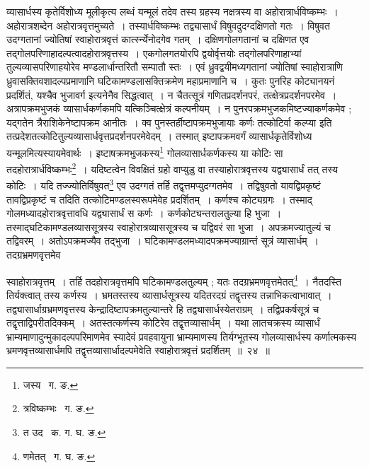 \documentclass[11pt, openany]{book}
\begin{document}
\noindent व्यासार्धस्य कृतेर्विशोध्य मूलीकृत्य लब्धं यन्मूलं तदेव तस्य ग्रहस्य नक्षत्रस्य वा अहोरात्रार्धविष्कम्भः~। अहोरात्रशब्देन
अहोरात्रवृत्तमुच्यते~। तस्यार्धविष्कम्भः तद्व्यासार्धं विषुवदुदग्दक्षिणतो गतः~। विषुवत उदग्गतानां ज्योतिषां स्वाहोरात्रवृत्तं कार्त्स्न्येनोदगेव गतम्~।
दक्षिणगोलगतानां च दक्षिणत एव तद्गोलपरिणाहादल्पत्वादहोरात्रवृत्तस्य~। एकगोलगतयोरपि द्वयोर्वृत्तयोः तद्गोलपरिणाहाभ्यां तुल्यव्यासपरिणाहयोरेव 
मण्डलार्धान्तरितौ सम्पातौ स्तः~। एवं ध्रुवद्वयीमध्यगतानां ज्योतिषां स्वाहोरात्राणि ध्रुवासक्तिवशादल्पप्रमाणानि घटिकामण्डलासक्तिक्रमेण 
महाप्रमाणानि च~। कुतः पुनरिह कोट्यानयनं प्रदर्शितं, {\qt यश्चैव भुजावर्ग} इत्यनेनैव सिद्धत्वात्~। न चैतत्सूत्रं गणितप्रदर्शनपरं,
तत्क्षेत्रप्रदर्शनपरमेव~। अत्रापक्रमभुजकं व्यासार्धकर्णकमपि यत्किञ्चित्क्षेत्रं कल्पनीयम्~। न पुनरपक्रमभुजकमिष्टज्याकर्णकमेव ; यद्गतेन त्रैराशिकेनेष्टापक्रम आनीतः~। क्व पुनस्तर्हीष्टापक्रमभुजायाः कर्णः तत्कोटिर्वा कल्प्या इति तत्प्रदेशतत्कोटितुल्यव्यासार्धवृत्तप्रदर्शनपरमेवेदम्~। तस्मात् इष्टापक्रमवर्गं व्यासार्धकृतेर्विशोध्य यन्मूलमित्यस्यायमेवार्थः~।  इष्टाषक्रमभुजकस्य\renewcommand{\thefootnote}{१}\footnote{जस्य \textendash\ ग. ङ.} गोलव्यासार्धकर्णकस्य या कोटिः सा तदहोरात्रार्धविष्कम्भः\renewcommand{\thefootnote}{२}\footnote{त्रविष्कम्भः \textendash\ ग. ङ.}~। यदिष्टत्वेन विवक्षितं ग्रहो वाप्युडु वा तस्याहोरात्रवृत्तस्य यद्व्यासार्धं तत् तस्य कोटिः~। यदि तज्ज्योतिर्विषुवत\renewcommand{\thefootnote}{३}\footnote{त उद \textendash\ क. ग. घ. ङ.} एव उदग्गतं तर्हि तद्वृत्तमप्युदग्गतमेव~। तद्विषुवतो यावद्विप्रकृष्टं तावद्विप्रकृष्टं च तदिति तत्कोटिमण्डलस्वरूपमेवेह प्रदर्शितम्~। कर्णश्च कोट्यग्रगः~। तस्माद्
गोलमध्यादहोरात्रवृत्तावधि यद्व्यासार्धं स कर्णः~। कर्णकोट्यन्तरालतुल्या हि भुजा~। तस्माद्घटिकामण्डलव्याससूत्रस्य स्वाहोरात्रव्याससूत्रस्य च यद्विवरं सा भुजा~। अपक्रमज्यातुल्यं च तद्विवरम्~। अतोऽपक्रमज्यैव तद्भुजा~। घटिकामण्डलमध्यादपक्रमज्याग्रान्तं सूत्रं व्यासार्धम्~।
तदग्रभ्रमणवृत्तमेव 

\newpage

\noindent स्वाहोरात्रवृत्तम्~। तर्हि तदहोरात्रवृत्तमपि घटिकामण्डलतुल्यम् ; यतः तदग्रभ्रमणवृत्तमेतत्\renewcommand{\thefootnote}{१}\footnote{णमेतत् \textendash\ ग. घ. ङ.}~। नैतदस्ति तिर्यक्त्वात् तस्य कर्णस्य~। भ्रमतस्तस्य व्यासार्धसूत्रस्य यदितरदग्रं तद्वृत्तस्य तन्नाभिकत्वाभावात्~। तद्व्यासार्धाग्रभ्रमणवृत्तस्य केन्द्रादिष्टापक्रमतुल्यान्तरे हि तद्व्यासार्धस्येतराग्रम्~। तद्विप्रकर्षसूत्रं च तद्वृत्ताद्विपरीतदिक्कम्~। अतस्तत्कर्णस्य कोटिरेव तद्वृत्तव्यासार्धम्~। यथा लातचक्रस्य व्यासार्धं भ्राम्यमाणादुन्मुकादल्पपरिमाणमेव स्यादेवं प्रवहवायुना भ्राम्यमाणस्य तिर्यग्भूतस्य गोलव्यासार्धस्य कर्णात्मकस्य भ्रमणवृत्तव्यासार्धमपि तद्वृत्तव्यासार्धादल्पमेवेति स्वाहोरात्रवृत्तं प्रदर्शितम्~॥~२४~॥ \\
\end{document}
